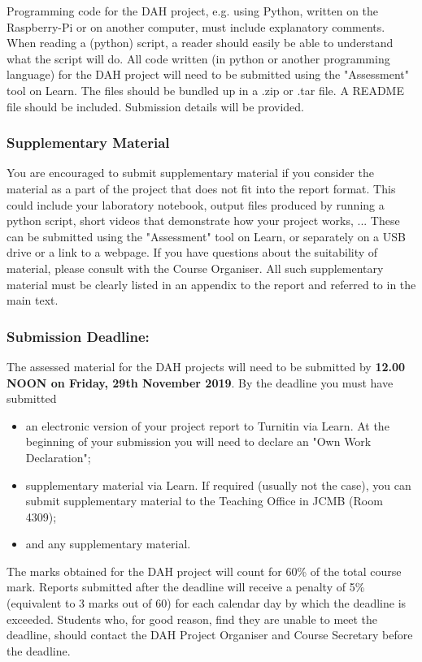 Programming code for the DAH project, e.g. using Python, written on the Raspberry-Pi or on another computer, must include explanatory comments. When reading a (python) script, a reader should easily be able to understand what the script will do. All code written (in python or another programming language)  for the DAH project will need to be submitted using the "Assessment" tool on Learn.  The files should be bundled up in a .zip or .tar file. A README file should be included. Submission details will be provided.

\subsubsection{Supplementary Material}

You are encouraged to submit supplementary material if you consider the material as a part of the project that does not fit into the report format. This could include your laboratory notebook, output files produced by running a python script, short videos that demonstrate how your project works, ... These can be submitted  using the "Assessment" tool on Learn, or separately on a USB drive or a link to a webpage. If you have questions about the suitability of material, please consult with the Course Organiser. All such supplementary material must be clearly listed in an appendix to the report and referred to in the main text. 

\subsubsection{Submission Deadline:}
The assessed material for the DAH projects will need to be submitted by {\bf 12.00 NOON on Friday, 29th November 2019}. By the deadline you must have submitted 
\begin{itemize}
\item an electronic version of your project report to Turnitin via Learn.
At the beginning of your submission you will need to declare an "Own Work Declaration";
\item supplementary material via Learn. If required (usually not the case), 
you can submit supplementary material to the Teaching Office in JCMB (Room 4309);
\item and any supplementary material. 
\end{itemize}
The marks obtained for the DAH project will count for 60\% of the total course mark. 
Reports submitted after the deadline will receive a penalty of 5\% (equivalent to 3 marks out of 60) for each calendar day by which the deadline is exceeded. Students who, for good reason, find they are unable to meet the deadline, should contact the DAH Project Organiser and Course Secretary before
the deadline.

